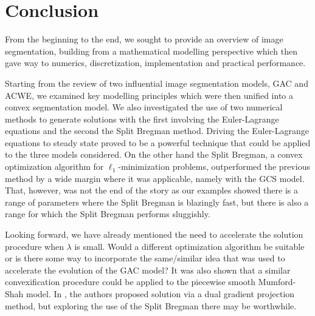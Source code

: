 \chapter{Conclusion}
\label{ch:con}

From the beginning to the end, we sought to provide an overview of image segmentation, building from a mathematical modelling perspective which then gave way to numerics, discretization, implementation and practical performance. 

Starting from the review of two influential image segmentation models, GAC and ACWE, we examined key modelling principles which were then unified into a convex segmentation model. We also investigated the use of two numerical methods to generate solutions with the first involving the Euler-Lagrange equations and the second the Split Bregman method. Driving the Euler-Lagrange equations to steady state proved to be a powerful technique that could be applied to the three models considered. On the other hand the Split Bregman, a convex optimization algorithm for $\ell_1$-minimization problems, outperformed the previous method by a wide margin where it was applicable, namely with the GCS model. That, however, was not the end of the story as our examples showed there is a range of parameters where the Split Bregman is blazingly fast, but there is also a range for which the Split Bregman performs sluggishly.

Looking forward, we have already mentioned the need to accelerate the solution procedure when $\lambda$ is small. Would a different optimization algorithm be suitable or is there some way to incorporate the same/similar idea that was used to accelerate the evolution of the GAC model? It was also shown that a similar convexification procedure could be applied to the piecewise smooth Mumford-Shah model. In \cite{bresson2007fast}, the authors proposed solution via a dual gradient projection method, but exploring the use of the Split Bregman there may be worthwhile.
